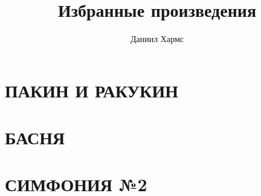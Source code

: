 \documentclass[a4paper, 12pt]{article}
\begin{document}
	\title{Избранные произведения}
	\author{Даниил Хармс}

	\maketitle
	
	\section*{ПАКИН И РАКУКИН}
	

	\section*{БАСНЯ}
	

	\section*{}
	

	\section*{}
	

	\section*{СИМФОНИЯ №2}
	
\end{document}

